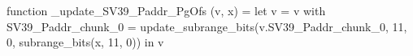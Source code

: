 function _update_SV39_Paddr_PgOfs (v, x) = let v = { v with SV39_Paddr_chunk_0 = update_subrange_bits(v.SV39_Paddr_chunk_0, 11, 0, subrange_bits(x, 11, 0)) } in
  v
